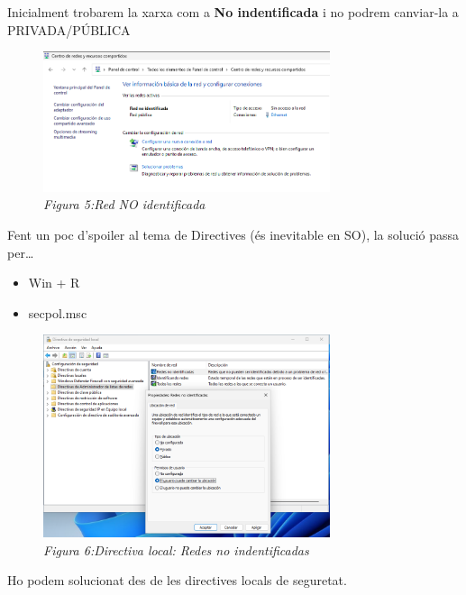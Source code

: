 \documentclass[
  a4paper,
]{article}
\providecommand{\tightlist}{%
  \setlength{\itemsep}{0pt}\setlength{\parskip}{0pt}}
\begin{document}
Inicialment trobarem la xarxa com a \textbf{No indentificada} i no
podrem canviar-la a PRIVADA/PÚBLICA

\begin{figure}
\centering
\includegraphics[width=0.75\textwidth,height=\textheight]{png/redNoIdentificada.png}
\caption{\emph{Figura 5:Red NO identificada}}
\end{figure}

Fent un poc d'spoiler al tema de Directives (és inevitable en SO), la
solució passa per\ldots{}

\begin{itemize}
\tightlist
\item
  Win + R
\item
  secpol.msc
\end{itemize}

\begin{figure}
\centering
\includegraphics[width=0.75\textwidth,height=\textheight]{png/secpolRedesNoIdentificadas.png}
\caption{\emph{Figura 6:Directiva local: Redes no indentificadas}}
\end{figure}

Ho podem solucionat des de les directives locals de seguretat.
\end{document}
